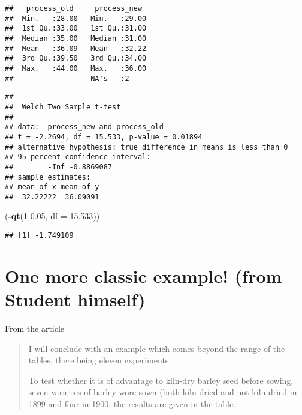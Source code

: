 \documentclass[]{book}
\newenvironment{Shaded}{\begin{snugshade}}{\end{snugshade}}
\newcommand{\DataTypeTok}[1]{\textcolor[rgb]{0.13,0.29,0.53}{#1}}
\newcommand{\DecValTok}[1]{\textcolor[rgb]{0.00,0.00,0.81}{#1}}
\newcommand{\FloatTok}[1]{\textcolor[rgb]{0.00,0.00,0.81}{#1}}
\newcommand{\KeywordTok}[1]{\textcolor[rgb]{0.13,0.29,0.53}{\textbf{#1}}}
\newcommand{\NormalTok}[1]{#1}
\newcommand{\OperatorTok}[1]{\textcolor[rgb]{0.81,0.36,0.00}{\textbf{#1}}}
\newcommand{\OtherTok}[1]{\textcolor[rgb]{0.56,0.35,0.01}{#1}}
\newcommand{\StringTok}[1]{\textcolor[rgb]{0.31,0.60,0.02}{#1}}
\theoremstyle{definition}
\theoremstyle{definition}
\theoremstyle{definition}
\theoremstyle{remark}
\begin{document}
\begin{verbatim}
##   process_old     process_new   
##  Min.   :28.00   Min.   :29.00  
##  1st Qu.:33.00   1st Qu.:31.00  
##  Median :35.00   Median :31.00  
##  Mean   :36.09   Mean   :32.22  
##  3rd Qu.:39.50   3rd Qu.:34.00  
##  Max.   :44.00   Max.   :36.00  
##                  NA's   :2
\end{verbatim}

\begin{Shaded}
\end{Shaded}

\begin{verbatim}
## 
##  Welch Two Sample t-test
## 
## data:  process_new and process_old
## t = -2.2694, df = 15.533, p-value = 0.01894
## alternative hypothesis: true difference in means is less than 0
## 95 percent confidence interval:
##        -Inf -0.8869087
## sample estimates:
## mean of x mean of y 
##  32.22222  36.09091
\end{verbatim}

\begin{Shaded}
\begin{Highlighting}[]
\NormalTok{(}\OperatorTok{-}\KeywordTok{qt}\NormalTok{(}\DecValTok{1}\FloatTok{-0.05}\NormalTok{, }\DataTypeTok{df =} \FloatTok{15.533}\NormalTok{))}
\end{Highlighting}
\end{Shaded}

\begin{verbatim}
## [1] -1.749109
\end{verbatim}

\hypertarget{one-more-classic-example-from-student-himself}{%
\section{One more classic example! (from Student
himself)}\label{one-more-classic-example-from-student-himself}}

From the article

\begin{quote}
I will conclude with an example which comes beyond the range of the
tables, there being eleven experiments.

To test whether it is of advantage to kiln-dry barley seed before
sowing, seven varieties of barley wore sown (both kiln-dried and not
kiln-dried in 1899 and four in 1900; the results are given in the table.
\end{quote}
\end{document}
